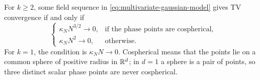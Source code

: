 \begin{theorem}
\label{thm:gaussian-geometry}
For $k\ge2$, some field sequence in
\eqref{eq:multivariate-gaussian-model} gives TV convergence if and only if
\begin{equation}
 \begin{cases}
 \kappa_NN^{3/2}\to0,&\text{if the phase points are cospherical},\\
 \kappa_NN^2\to0,&\text{otherwise}.
 \end{cases}
 \label{eq:gaussian-geometry-classification}
\end{equation}
For $k=1$, the condition is $\kappa_NN\to0$. Cospherical means
that the points lie on a common sphere of positive radius in $\mathbb R^d$;
in $d=1$ a sphere is a pair of points, so three distinct scalar
phase points are never cospherical.
\end{theorem}
